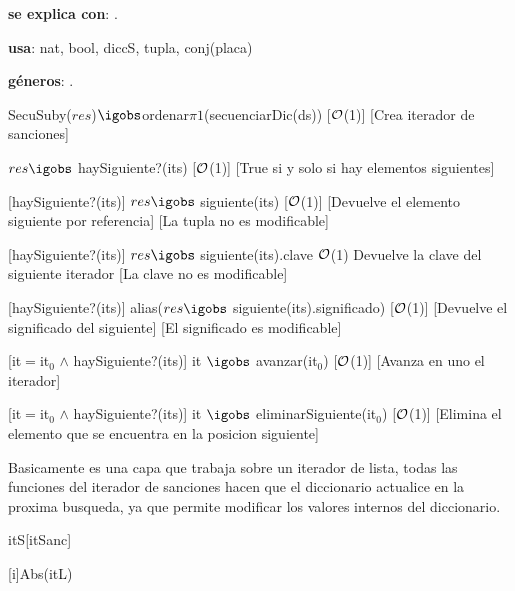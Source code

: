 \begin{Interfaz}

	\textbf{se explica con}: .

	\textbf{usa}: nat, bool, diccS, tupla, conj(placa)

	\textbf{géneros}: .

	
		
	{SecuSuby($res$)$\igobs$ordenar$\pi1$(secuenciarDic(ds))}
	[$\mathcal{O}$(1)]
	[Crea iterador de sanciones]
	
	{$res \igobs$ haySiguiente?(its)}
	[$\mathcal{O}$(1)]
	[True si y solo si hay elementos siguientes]
	
	[haySiguiente?(its)]
	{$res \igobs$ siguiente(its)}
	[$\mathcal{O}$(1)]
	[Devuelve el elemento siguiente por referencia]
	[La tupla no es modificable]
	
	[haySiguiente?(its)]
	{$res \igobs$ siguiente(its).clave}
	{$\mathcal{O}$(1)}
	{Devuelve la clave del siguiente iterador}
	[La clave no es modificable]
	
	[haySiguiente?(its)]
	{alias($res \igobs$ siguiente(its).significado)}
	[$\mathcal{O}$(1)]
	[Devuelve el significado del siguiente]
	[El significado es modificable]
	
	[it$=$it$_0$ $\land$ haySiguiente?(its)]
	{it $\igobs$ avanzar(it$_0$)}
	[$\mathcal{O}$(1)]
	[Avanza en uno el iterador]

	[it$=$it$_0$ $\land$ haySiguiente?(its)]
	{it $\igobs$ eliminarSiguiente(it$_0$)}
	[$\mathcal{O}$(1)]
	[Elimina el elemento que se encuentra en la posicion siguiente]


\end{Interfaz}

\begin{Representacion}
	
	Basicamente es una capa que trabaja sobre un iterador de lista, todas las funciones del iterador de sanciones hacen que el diccionario actualice en la proxima busqueda, ya que permite modificar los valores internos del diccionario.
	
	\begin{Estructura}{itS}[itSanc]
	    \begin{Tupla}[itSanc]
		\end{Tupla}
	\end{Estructura}
	
	
	
	{Abs(itL)}

\end{Representacion}

